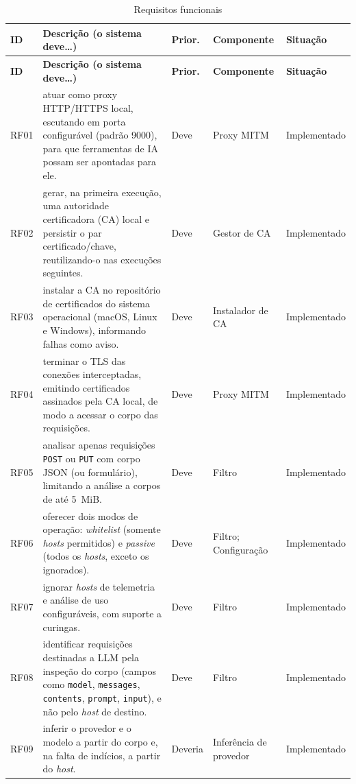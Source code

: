 {\small
\begin{longtable}{|p{1.15cm}|p{7.6cm}|p{1.7cm}|p{2.2cm}|p{2.0cm}|}
\caption{Requisitos funcionais}\label{tab:rf}\\
\hline
\textbf{ID} & \textbf{Descrição (o sistema deve\ldots)} & \textbf{Prior.} & \textbf{Componente} & \textbf{Situação} \\ \hline
\endfirsthead
\hline
\textbf{ID} & \textbf{Descrição (o sistema deve\ldots)} & \textbf{Prior.} & \textbf{Componente} & \textbf{Situação} \\ \hline
\endhead
RF01 & atuar como proxy HTTP/HTTPS local, escutando em porta configurável (padrão 9000), para que ferramentas de IA possam ser apontadas para ele. & Deve & Proxy MITM & Implementado \\ \hline
RF02 & gerar, na primeira execução, uma autoridade certificadora (CA) local e persistir o par certificado/chave, reutilizando-o nas execuções seguintes. & Deve & Gestor de CA & Implementado \\ \hline
RF03 & instalar a CA no repositório de certificados do sistema operacional (macOS, Linux e Windows), informando falhas como aviso. & Deve & Instalador de CA & Implementado \\ \hline
RF04 & terminar o TLS das conexões interceptadas, emitindo certificados assinados pela CA local, de modo a acessar o corpo das requisições. & Deve & Proxy MITM & Implementado \\ \hline
RF05 & analisar apenas requisições \texttt{POST} ou \texttt{PUT} com corpo JSON (ou formulário), limitando a análise a corpos de até 5~MiB. & Deve & Filtro & Implementado \\ \hline
RF06 & oferecer dois modos de operação: \textit{whitelist} (somente \textit{hosts} permitidos) e \textit{passive} (todos os \textit{hosts}, exceto os ignorados). & Deve & Filtro; Configuração & Implementado \\ \hline
RF07 & ignorar \textit{hosts} de telemetria e análise de uso configuráveis, com suporte a curingas. & Deve & Filtro & Implementado \\ \hline
RF08 & identificar requisições destinadas a LLM pela inspeção do corpo (campos como \texttt{model}, \texttt{messages}, \texttt{contents}, \texttt{prompt}, \texttt{input}), e não pelo \textit{host} de destino. & Deve & Filtro & Implementado \\ \hline
RF09 & inferir o provedor e o modelo a partir do corpo e, na falta de indícios, a partir do \textit{host}. & Deveria & Inferência de provedor & Implementado \\ \hline

\end{longtable}}
